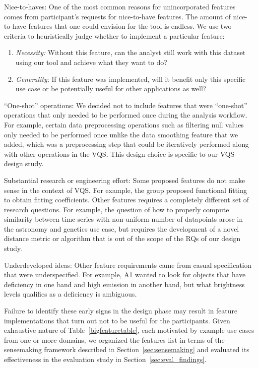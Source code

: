 {  \begin{denselist}
  \item Nice-to-haves: One of the most common reasons for unincorporated features comes from participant's requests for nice-to-have features. The amount of nice-to-have features that one could envision for the tool is endless. We use
  two criteria to heuristically judge whether to implement a particular feature:
  \begin{enumerate}[leftmargin=*]
  \item \textit{Necessity:} Without this feature, can the analyst still work with this dataset using our tool and achieve what they want to do?
  \item \textit{Generality:} If this feature was implemented, will it benefit only this specific use case or be potentially useful for other applications as well?
  \end{enumerate}
  \item ``One-shot'' operations: We decided not to include features that were ``one-shot'' operations that only needed to be performed once during the analysis workflow. For example, certain data preprocessing operations such as filtering null values only needed to be performed once unlike the data smoothing feature that we added, which was a preprocessing step that could be iteratively performed along with other operations in the VQS. This design choice is specific to our VQS design study.
  \item Substantial research or engineering effort: Some proposed features do not make sense in the context of VQS. For example, the \matsci group proposed functional fitting to obtain fitting coefficients. Other features requires a completely different set of research questions. For example, the question of how to properly compute similarity between time series with non-uniform number of datapoints arose in the astronomy and genetics use case, but requires the development of a novel distance metric or algorithm that is out of the scope of the RQs of our design study.
  \item Underdeveloped ideas: Other feature requirements came from casual specification that were underspecified. For example, A1 wanted to look for objects that have deficiency in one band and high emission in another band, but what brightness levels qualifies as a deficiency is ambiguous.
  \end{denselist}
  \par Failure to identify these early signs in the design phase may result in feature implementations that turn out not to be useful for the participants. Given exhaustive nature of Table~\ref{bigfeaturetable}, each motivated by example use cases from one or more domains, we organized the features list in terms of the sensemaking framework described in Section~\ref{sec:sensemaking} and evaluated its effectiveness in the evaluation study in Section~\ref{sec:eval_findings}.
}

